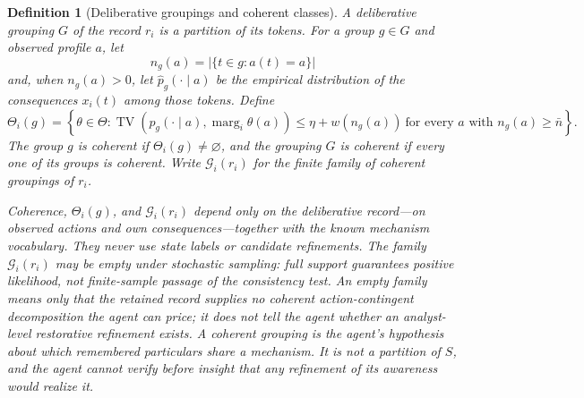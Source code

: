 \documentclass[11pt]{article}
\newtheorem{definition}[assumption]{Definition}
\theoremstyle{definition}
\newcommand{\emptysetset}{\varnothing}
\newcommand{\TV}{\operatorname{TV}}
\newcommand{\marg}[1]{\operatorname{marg}_{#1}}
\begin{document}
\begin{definition}[Deliberative groupings and coherent classes]
\label{def:pinned}
A \emph{deliberative grouping} $G$ of the record $r_i$ is a partition of its tokens.
For a group $g\in G$ and observed profile $a$, let
\[
n_g(a)=\bigl|\{t\in g:a(t)=a\}\bigr|
\]
and, when $n_g(a)>0$, let $\hat p_g(\cdot\mid a)$ be the empirical distribution of the consequences $x_i(t)$ among those tokens.
Define
\[
\Theta_i(g)
=
\left\{
\theta\in\Theta:
\TV\!\left(
\hat p_g(\cdot\mid a),\marg{i}\theta(a)
\right)
\leq
\eta+w\!\left(n_g(a)\right)
\ \text{for every }a\text{ with }n_g(a)\geq\bar n
\right\}.
\]
The group $g$ is \emph{coherent} if $\Theta_i(g)\neq\emptysetset$, and the grouping $G$ is coherent if every one of its groups is coherent.
Write $\mathcal G_i(r_i)$ for the finite family of coherent groupings of $r_i$.

Coherence, $\Theta_i(g)$, and $\mathcal G_i(r_i)$ depend only on the deliberative record---on observed actions and own consequences---together with the known mechanism vocabulary.
They never use state labels or candidate refinements.
The family $\mathcal G_i(r_i)$ may be empty under stochastic sampling: full support guarantees positive likelihood, not finite-sample passage of the consistency test.
An empty family means only that the retained record supplies no coherent action-contingent decomposition the agent can price; it does not tell the agent whether an analyst-level restorative refinement exists.
A coherent grouping is the agent's hypothesis about which remembered particulars share a mechanism.
It is not a partition of $S$, and the agent cannot verify before insight that any refinement of its awareness would realize it.
\end{definition}
\end{document}
